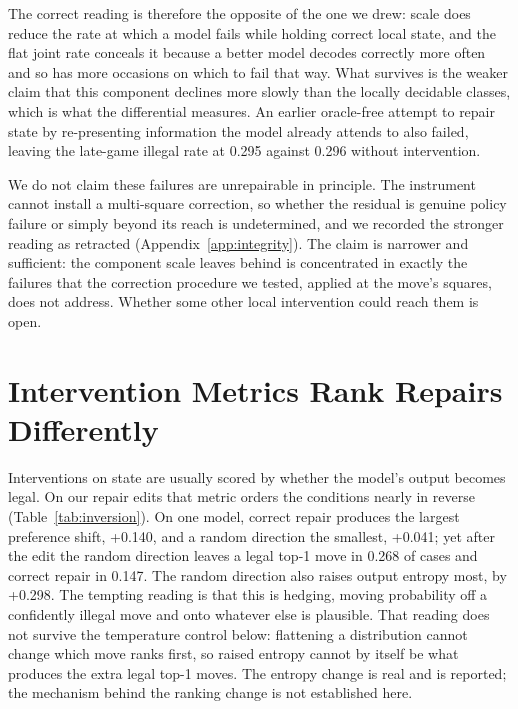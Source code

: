\documentclass[11pt]{article}
\begin{document}
The correct reading is therefore the opposite of the one we drew: scale does reduce
the rate at which a model fails while holding correct local state, and the flat
joint rate conceals it because a better model decodes correctly more often and so
has more occasions on which to fail that way. What survives is the weaker claim
that this component declines more slowly than the locally decidable classes, which
is what the differential measures.
An earlier oracle-free attempt to repair state by re-presenting information the
model already attends to also failed, leaving the late-game illegal rate at
0.295 against 0.296 without intervention.

We do not claim these failures are unrepairable in principle. The instrument cannot
install a multi-square correction, so whether the residual is genuine policy
failure or simply beyond its reach is undetermined, and we recorded the stronger
reading as retracted (Appendix~\ref{app:integrity}). The claim is narrower and
sufficient: the component scale leaves behind is concentrated in exactly the
failures that the correction procedure we tested, applied at the move's squares,
does not address. Whether some other local intervention could reach them is open.

\section{Intervention Metrics Rank Repairs Differently}
\label{sec:inversion}

Interventions on state are usually scored by whether the model's output becomes
legal. On our repair edits that metric orders the conditions nearly in reverse
(Table~\ref{tab:inversion}). On one model, correct repair produces the largest
preference shift, +0.140, and a random direction the smallest,
+0.041; yet after the edit the random direction leaves a legal top-1 move
in 0.268 of cases and correct repair in 0.147. The random
direction also raises output entropy most, by +0.298. The tempting reading is
that this is hedging, moving probability off a confidently illegal move and onto
whatever else is plausible. That reading does not survive the temperature control
below: flattening a distribution cannot change which move ranks first, so raised
entropy cannot by itself be what produces the extra legal top-1 moves. The entropy
change is real and is reported; the mechanism behind the ranking change is not
established here.
\end{document}
